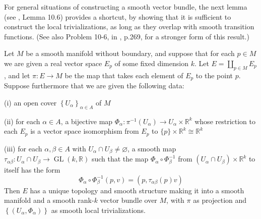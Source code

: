 \documentclass{ctexart}
\begin{document}
For general situations of constructing a smooth vector bundle, the next lemma (see \cite{leeIntroductionSmoothManifolds2013}, Lemma 10.6) provides a shortcut, 
by showing that it is sufficient to construct the local trivializations, as long as they overlap with smooth transition functions. 
(See also Problem 10-6, in \cite{leeIntroductionSmoothManifolds2013}, p.269, for a stronger form of this result.)
\begin{lemma}
  Let $M$ be a smooth manifold without boundary, and suppose that for each $p \in M$ we are given a real vector space $E_p$ of some fixed dimension $k$. 
  Let $E=\coprod_{p \in M} E_p$, and let $\pi: E \rightarrow M$ be the map that takes each element of $E_p$ to the point $p$. 
  Suppose furthermore that we are given the following data:

  (i) an open cover $\left\{U_\alpha\right\}_{\alpha \in A}$ of $M$

  (ii) for each $\alpha \in A$, a bijective map $\Phi_\alpha: \pi^{-1}\left(U_\alpha\right) \rightarrow U_\alpha \times \mathbb{R}^k$ 
  whose restriction to each $E_p$ is a vector space isomorphism from $E_p$ to $\{p\} \times \mathbb{R}^k \cong \mathbb{R}^k$

  (iii) for each $\alpha, \beta \in A$ with $U_\alpha \cap U_\beta \neq \varnothing$, a smooth map $\tau_{\alpha \beta}: U_\alpha \cap U_\beta \rightarrow\operatorname{GL}(k, \mathbb{R})$ 
  such that the map $\Phi_\alpha \circ \Phi_\beta^{-1}$ from $\left(U_\alpha \cap U_\beta\right) \times \mathbb{R}^k$ to itself has the form
  $$
  \Phi_\alpha \circ \Phi_\beta^{-1}(p, v)=\left(p, \tau_{\alpha \beta}(p) v\right)
  $$
  Then $E$ has a unique topology and smooth structure making it into a smooth manifold and a smooth rank-$k$ vector bundle over $M$, 
  with $\pi$ as projection and $\left\{\left(U_\alpha, \Phi_\alpha\right)\right\}$ as smooth local trivializations.
\end{lemma}
\end{document}
